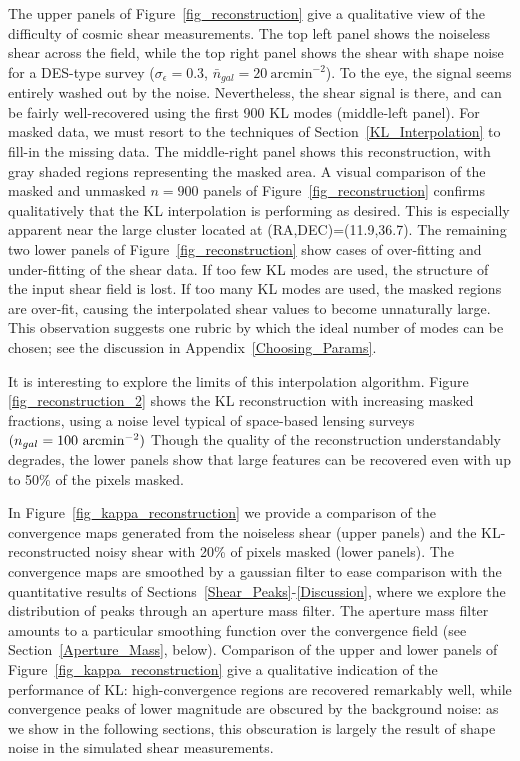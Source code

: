 The upper panels of Figure~\ref{fig_reconstruction} give a qualitative view
of the difficulty of cosmic shear measurements.  The top left panel shows the
noiseless shear across the field, while the top right panel shows the
shear with shape noise for a DES-type survey ($\sigma_\epsilon=0.3$, 
$\bar{n}_{gal} = 20\ \mathrm{arcmin}^{-2}$).  To the eye, the signal seems
entirely washed out by the noise.  Nevertheless, the shear signal is there,
and can be fairly well-recovered using the first 900 KL modes 
(middle-left panel). For masked data, we must resort to the 
techniques of Section~\ref{KL_Interpolation} to fill-in the missing data.
The middle-right panel shows this reconstruction, with gray shaded
regions representing the masked area.  A visual comparison of the masked 
and unmasked $n=900$ panels of Figure~\ref{fig_reconstruction} confirms
qualitatively that the KL interpolation is performing as desired.  This is
especially apparent near the large cluster located at (RA,DEC)=(11.9,36.7).  
The remaining two lower panels of Figure~\ref{fig_reconstruction} 
show cases of over-fitting and under-fitting
of the shear data. If too few KL modes are used, the structure of the input 
shear field is lost.  If too many KL modes are used, the masked regions 
are over-fit,
causing the interpolated shear values to become unnaturally large.  This
observation suggests one rubric by which the ideal number of modes can be
chosen; see the discussion in Appendix~\ref{Choosing_Params}.

It is interesting to explore the limits of this interpolation algorithm.
Figure \ref{fig_reconstruction_2} shows the KL reconstruction with
increasing masked fractions, using a noise level typical of space-based
lensing surveys $(n_{gal}=100\ {\rm arcmin}^{-2})$  Though the quality of
the reconstruction understandably degrades, the lower panels show that
large features can be recovered even with up to 50\% of the pixels masked.

In Figure~\ref{fig_kappa_reconstruction} we provide a comparison of the
convergence maps generated from the noiseless shear (upper panels) and
the KL-reconstructed noisy shear with 20\% of pixels masked (lower panels).  
The convergence maps are smoothed by a gaussian filter to 
ease comparison with the quantitative
results of Sections~\ref{Shear_Peaks}-\ref{Discussion}, where we explore
the distribution of peaks through an aperture mass filter.  The aperture
mass filter amounts to a particular smoothing function over the 
convergence field (see Section~\ref{Aperture_Mass}, below).
Comparison of the upper and lower panels of 
Figure~\ref{fig_kappa_reconstruction} give a qualitative indication of
the performance of KL: high-convergence regions are recovered remarkably
well, while convergence peaks of lower magnitude are obscured by the 
background noise: as we show in the following sections, 
this obscuration is largely the result of shape noise 
in the simulated shear measurements.

